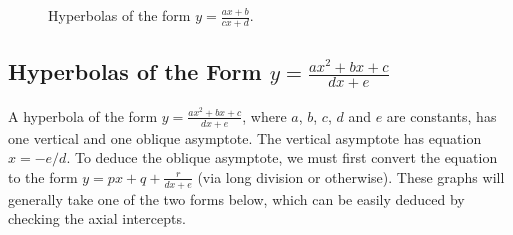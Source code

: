 \begin{figure}[H]
    \centering
    \caption{Hyperbolas of the form $y = \frac{ax + b}{cx + d}$.}
\end{figure}

\subsection{Hyperbolas of the Form \texorpdfstring{$y = \frac{ax^2 + bx + c}{dx + e}$}{y = (ax2 + bx + c)/(dx + e)}}

A hyperbola of the form $y = \frac{ax^2 + bx + c}{dx + e}$, where $a$, $b$, $c$, $d$ and $e$ are constants, has one vertical and one oblique asymptote. The vertical asymptote has equation $x = -e/d$. To deduce the oblique asymptote, we must first convert the equation to the form $y = px + q + \frac{r}{dx + e}$ (via long division or otherwise). These graphs will generally take one of the two forms below, which can be easily deduced by checking the axial intercepts.

